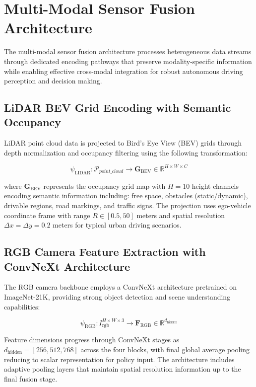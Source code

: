 \documentclass[10pt,twocolumn,letterpaper]{article}
\begin{document}
\section{Multi-Modal Sensor Fusion Architecture}

The multi-modal sensor fusion architecture processes heterogeneous data streams through dedicated encoding pathways that preserve modality-specific information while enabling effective cross-modal integration for robust autonomous driving perception and decision making.

\subsection{LiDAR BEV Grid Encoding with Semantic Occupancy}

LiDAR point cloud data is projected to Bird's Eye View (BEV) grids through depth normalization and occupancy filtering using the following transformation:

\begin{equation}
    \psi_\text{LIDAR}: \mathcal{P}_{point\_cloud} \rightarrow \mathbf{G}_\text{BEV} \in \mathbb{R}^{H\times W\times C}
    \label{eq:lidar_bev_encoding}
\end{equation}

where $\mathbf{G}_\text{BEV}$ represents the occupancy grid map with $H=10$ height channels encoding semantic information including: free space, obstacles (static/dynamic), drivable regions, road markings, and traffic signs. The projection uses ego-vehicle coordinate frame with range $R \in [0.5, 50]$ meters and spatial resolution $\Delta x = \Delta y = 0.2$ meters for typical urban driving scenarios.

\subsection{RGB Camera Feature Extraction with ConvNeXt Architecture}

The RGB camera backbone employs a ConvNeXt architecture pretrained on ImageNet-21K, providing strong object detection and scene understanding capabilities:

\begin{equation}
    \psi_\text{RGB}: I_\text{rgb}^{H\times W\times 3} \rightarrow \mathbf{F}_\text{RGB} \in \mathbb{R}^{d_\text{hidden}}
    \label{eq:rgb_convnext_extraction}
\end{equation}

Feature dimensions progress through ConvNeXt stages as $d_\text{hidden} = [256, 512, 768]$ across the four blocks, with final global average pooling reducing to scalar representation for policy input. The architecture includes adaptive pooling layers that maintain spatial resolution information up to the final fusion stage.
\end{document}
